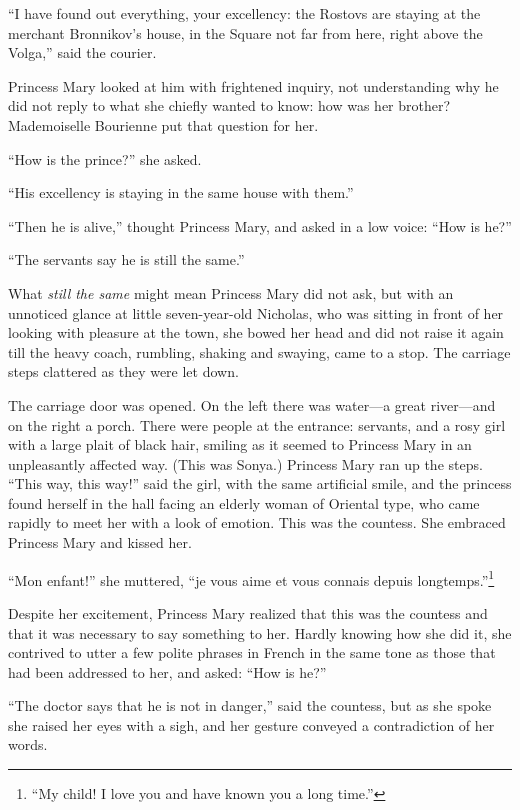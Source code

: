 ``I have found out everything, your excellency: the Rostovs are
staying at the merchant Bronnikov's house, in the Square not far
from here, right above the Volga,'' said the courier.

Princess Mary looked at him with frightened inquiry, not
understanding why he did not reply to what she chiefly wanted to
know: how was her brother? Mademoiselle Bourienne put that
question for her.

``How is the prince?'' she asked.

``His excellency is staying in the same house with them.''

``Then he is alive,'' thought Princess Mary, and asked in a low
voice: ``How is he?''

``The servants say he is still the same.''

What \emph{still the same} might mean Princess Mary did not ask,
but with an unnoticed glance at little seven-year-old Nicholas,
who was sitting in front of her looking with pleasure at the
town, she bowed her head and did not raise it again till the
heavy coach, rumbling, shaking and swaying, came to a stop. The
carriage steps clattered as they were let down.

The carriage door was opened. On the left there was water---a
great river---and on the right a porch. There were people at the
entrance: servants, and a rosy girl with a large plait of black
hair, smiling as it seemed to Princess Mary in an unpleasantly
affected way. (This was Sonya.) Princess Mary ran up the
steps. ``This way, this way!'' said the girl, with the same
artificial smile, and the princess found herself in the hall
facing an elderly woman of Oriental type, who came rapidly to
meet her with a look of emotion. This was the countess. She
embraced Princess Mary and kissed her.

``Mon enfant!'' she muttered, ``je vous aime et vous connais
depuis longtemps.''\footnote{``My child! I love you and have
known you a long time.''}

Despite her excitement, Princess Mary realized that this was the
countess and that it was necessary to say something to
her. Hardly knowing how she did it, she contrived to utter a few
polite phrases in French in the same tone as those that had been
addressed to her, and asked: ``How is he?''

``The doctor says that he is not in danger,'' said the countess,
but as she spoke she raised her eyes with a sigh, and her gesture
conveyed a contradiction of her words.


